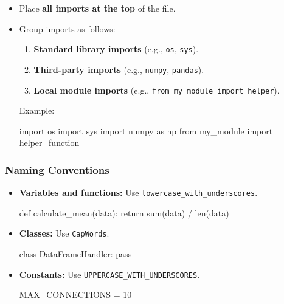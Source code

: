 \documentclass[
  letterpaper,
  DIV=11,
  numbers=noendperiod]{scrreprt}
\newenvironment{Shaded}{\begin{snugshade}}{\end{snugshade}}
\newcommand{\BuiltInTok}[1]{\textcolor[rgb]{0.00,0.23,0.31}{#1}}
\newcommand{\ControlFlowTok}[1]{\textcolor[rgb]{0.00,0.23,0.31}{#1}}
\newcommand{\DecValTok}[1]{\textcolor[rgb]{0.68,0.00,0.00}{#1}}
\newcommand{\ImportTok}[1]{\textcolor[rgb]{0.00,0.46,0.62}{#1}}
\newcommand{\KeywordTok}[1]{\textcolor[rgb]{0.00,0.23,0.31}{#1}}
\newcommand{\NormalTok}[1]{\textcolor[rgb]{0.00,0.23,0.31}{#1}}
\newcommand{\OperatorTok}[1]{\textcolor[rgb]{0.37,0.37,0.37}{#1}}
\providecommand{\tightlist}{%
  \setlength{\itemsep}{0pt}\setlength{\parskip}{0pt}}\usepackage{longtable,booktabs,array}
\begin{document}
\begin{itemize}
\item
  Place \textbf{all imports at the top} of the file.\\
\item
  Group imports as follows:

  \begin{enumerate}
  \def\labelenumi{\arabic{enumi}.}
  \tightlist
  \item
    \textbf{Standard library imports} (e.g., \texttt{os}, \texttt{sys}).
  \item
    \textbf{Third-party imports} (e.g., \texttt{numpy},
    \texttt{pandas}).
  \item
    \textbf{Local module imports} (e.g.,
    \texttt{from\ my\_module\ import\ helper}).
  \end{enumerate}

  Example:

\begin{Shaded}
\begin{Highlighting}[]
\ImportTok{import}\NormalTok{ os}
\ImportTok{import}\NormalTok{ sys}
\ImportTok{import}\NormalTok{ numpy }\ImportTok{as}\NormalTok{ np}
\ImportTok{from}\NormalTok{ my\_module }\ImportTok{import}\NormalTok{ helper\_function}
\end{Highlighting}
\end{Shaded}
\end{itemize}

\hypertarget{naming-conventions}{%
\subsubsection{Naming Conventions}\label{naming-conventions}}

\begin{itemize}
\item
  \textbf{Variables and functions:} Use
  \texttt{lowercase\_with\_underscores}.

\begin{Shaded}
\begin{Highlighting}[]
\KeywordTok{def}\NormalTok{ calculate\_mean(data):}
    \ControlFlowTok{return} \BuiltInTok{sum}\NormalTok{(data) }\OperatorTok{/} \BuiltInTok{len}\NormalTok{(data)}
\end{Highlighting}
\end{Shaded}
\item
  \textbf{Classes:} Use \texttt{CapWords}.

\begin{Shaded}
\begin{Highlighting}[]
\KeywordTok{class}\NormalTok{ DataFrameHandler:}
    \ControlFlowTok{pass}
\end{Highlighting}
\end{Shaded}
\item
  \textbf{Constants:} Use \texttt{UPPERCASE\_WITH\_UNDERSCORES}.

\begin{Shaded}
\begin{Highlighting}[]
\NormalTok{MAX\_CONNECTIONS }\OperatorTok{=} \DecValTok{10}
\end{Highlighting}
\end{Shaded}
\end{itemize}
\end{document}
